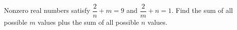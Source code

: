 Nonzero real numbers satisfy $\dfrac{2}{n}+m=9$ and $\dfrac{2}{m}+n=1$. Find the sum of all possible $m$ values plus the sum of all possible $n$ values.
